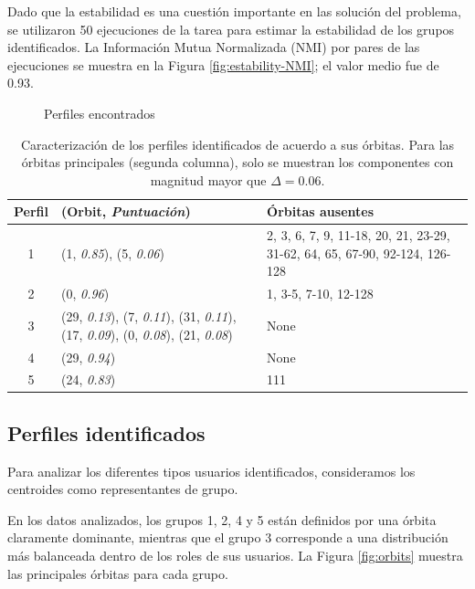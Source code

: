 Dado que la estabilidad es una cuestión importante en las solución del problema, se utilizaron 50 ejecuciones de la tarea para estimar la estabilidad de los grupos identificados. La Información Mutua Normalizada (NMI) por pares de las ejecuciones se muestra en la Figura \ref{fig:estability-NMI}; el valor medio fue de 0.93.

 \begin{figure}[htbp]
   \centering
   
    \caption{Perfiles encontrados}
    \label{fig:perfiles}
\end{figure}

\begin{table}[]    
    \centering
    \caption{Caracterización de los perfiles identificados de acuerdo a sus órbitas. Para las órbitas principales (segunda columna), solo se muestran los componentes con magnitud mayor que $\Delta=0.06$.}
    \begin{tabular}{cp{}p{}}\hline
         \textbf{Perfil}\phantom{xx} & \textbf{(Orbit, \textit{Puntuación})}&\textbf{Órbitas ausentes}\\\hline\hline
         1& (1, \textit{0.85}), (5, \textit{0.06})&2, 3, 6, 7, 9, 11-18, 20, 21, 23-29, 31-62, 64, 65, 67-90, 92-124, 126-128\\
         2&(0, \textit{0.96})&1, 3-5, 7-10, 12-128\\
         3&(29, \textit{0.13}), (7, \textit{0.11}), \newline(31, \textit{0.11}), (17, \textit{0.09}), \newline(0, \textit{0.08}), (21, \textit{0.08}) & None \\
         4& (29, \textit{0.94}) & None \\ 
         5&(24, \textit{0.83}) & 111 \\\hline
    \end{tabular}
    \label{table:orbitsgroups}
\end{table}

\subsection{Perfiles identificados}
Para analizar los diferentes tipos usuarios identificados, consideramos los centroides como representantes de grupo. 

En los datos analizados, los grupos 1, 2, 4 y 5 están definidos por una órbita claramente dominante, mientras que el grupo 3 corresponde a una distribución más balanceada dentro de los roles de sus usuarios. La Figura \ref{fig:orbits} muestra las principales órbitas para cada grupo. 

